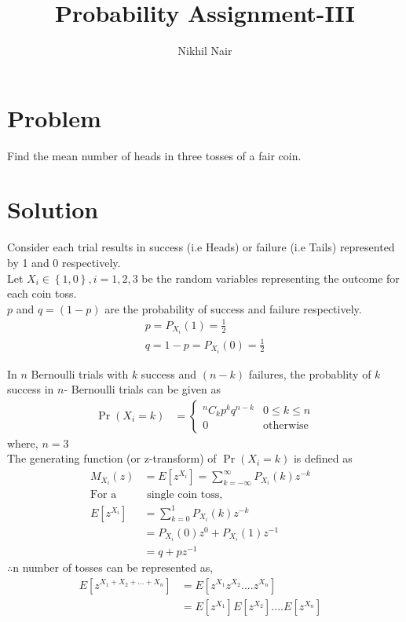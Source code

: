 \documentclass[journal,12pt,twocolumn]{IEEEtran}
\title{\mytitle}
\title{
Probability Assignment-III
}
\author{Nikhil Nair}
\providecommand{\pr}[1]{\ensuremath{\Pr\left(#1\right)}}
\begin{document}
\maketitle
\bigskip


\section{\textbf{Problem }}
Find the mean number of heads in three tosses of a fair coin.


\section{\textbf{Solution }}
Consider each trial results in success (i.e Heads) or failure (i.e Tails) represented by 1 and 0 respectively.
\\

Let $X_i \in \left\lbrace 1,0\right\rbrace  , i = 1,2,3$ be the random variables representing the outcome for each coin toss. 
\\

$p$ and $q = (1 - p)$ are the probability of success and failure respectively.
\begin{align}
& p = P_{X_i}(1) = \frac{1}{2}&               \label{1}
\\            
& q = 1 - p = P_{X_i}(0) = \frac{1}{2}&       \label{2}
\end{align}

In $n$ Bernoulli trials with $k$ success and $(n - k)$ failures, the probablity of $k$ success in $n$- Bernoulli trials can be given as\\
\begin{align}
\pr{X_i =k}  &= 
\begin{cases}
{}^nC_kp^{k}q^{n-k} & 0 \le k \le n
\\
0 & \text{otherwise}                 \label{3}
\end{cases}
\end{align}
where, $n = 3$\\

The generating function (or z-transform) of $\pr{X_i =k}$  is defined as 
\\
\begin{align}
M_{X_i}(z)& = E[z^{X_i}] = \sum_{k=-\infty}^{\infty} P_{X_i}(k)z^{-k}&
\\
\text{For a}&\text{ single coin toss,} &   \nonumber
\\
E[z^{X_i}]& = \sum_{k=0}^{1} P_{X_i}(k) z^{-k}&
\\
&=  P_{X_i}(0) z^{0} + P_{X_i}(1) z^{-1}&
\\
&= q+pz^{-1}&
\end{align}
$\therefore$n number of tosses can be represented as,
\\
\begin{align}
E[z^{X_1+X_2+...+X_n}]&= E[z^{X_1}z^{X_2}....z^{X_n}]& \nonumber
\\
&= E[z^{X_1}]E[z^{X_2}]....E[z^{X_n}]&
\end{align} 
\end{document}
